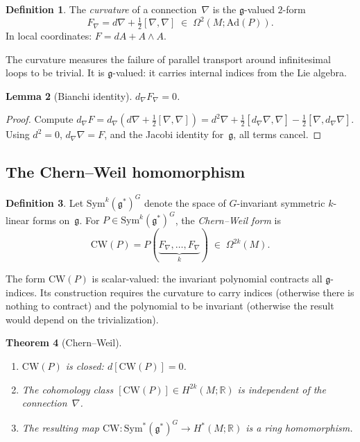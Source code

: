 \documentclass[11pt,reqno]{amsart}
\newtheorem{theorem}{Theorem}[section]
\newtheorem{lemma}[theorem]{Lemma}
\theoremstyle{definition}
\newtheorem{definition}[theorem]{Definition}
\theoremstyle{remark}
\newcommand{\fg}{\mathfrak{g}}
\newcommand{\Sym}{\mathrm{Sym}}
\newcommand{\Ad}{\mathrm{Ad}}
\newcommand{\CW}{\mathrm{CW}}
\numberwithin{equation}{section}
\begin{document}
\begin{definition}\label{def:curvature}
The \emph{curvature} of a connection~$\nabla$ is the
$\fg$-valued $2$-form
\begin{equation}\label{eq:curvature-def}
F_\nabla = d\nabla + \tfrac{1}{2}[\nabla,\nabla]
 \;\in\; \Omega^2(M;\Ad(P)).
\end{equation}
In local coordinates: $F = dA + A \wedge A$.
\end{definition}

The curvature measures the failure of parallel transport around
infinitesimal loops to be trivial. It is $\fg$-valued: it
carries internal indices from the Lie algebra.

\begin{lemma}[Bianchi identity]\label{lem:bianchi}
$d_\nabla F_\nabla = 0$.
\end{lemma}

\begin{proof}
Compute $d_\nabla F = d_\nabla(d\nabla +
\frac{1}{2}[\nabla,\nabla]) = d^2\nabla +
\frac{1}{2}[d_\nabla\nabla,\nabla] -
\frac{1}{2}[\nabla,d_\nabla\nabla]$. Using $d^2 = 0$,
$d_\nabla\nabla = F$, and the Jacobi identity for~$\fg$,
all terms cancel.
\end{proof}

\subsection{The Chern--Weil homomorphism}

\begin{definition}\label{def:inv-poly}
Let $\Sym^k(\fg^*)^G$ denote the space of $G$-invariant
symmetric $k$-linear forms on~$\fg$. For
$P \in \Sym^k(\fg^*)^G$, the \emph{Chern--Weil form} is
\begin{equation}\label{eq:cw-form}
\CW(P) = P(\underbrace{F_\nabla, \ldots, F_\nabla}_k)
 \;\in\; \Omega^{2k}(M).
\end{equation}
\end{definition}

The form $\CW(P)$ is scalar-valued: the invariant polynomial
contracts all $\fg$-indices. Its construction requires the
curvature to carry indices (otherwise there is nothing to
contract) and the polynomial to be invariant (otherwise the
result would depend on the trivialization).

\begin{theorem}[Chern--Weil]\label{thm:cw}
\begin{enumerate}[\upshape(i)]
\item $\CW(P)$ is closed: $d[\CW(P)] = 0$.
\item The cohomology class $[\CW(P)] \in H^{2k}(M;\mathbb{R})$
 is independent of the connection~$\nabla$.
\item The resulting map
 $\CW\colon \Sym^*(\fg^*)^G \to H^*(M;\mathbb{R})$
 is a ring homomorphism.
\end{enumerate}
\end{theorem}
\end{document}
